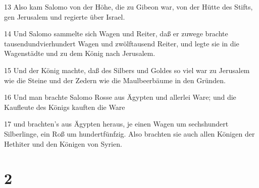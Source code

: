\par 13 Also kam Salomo von der Höhe, die zu Gibeon war, von der Hütte des Stifts, gen Jerusalem und regierte über Israel.
\par 14 Und Salomo sammelte sich Wagen und Reiter, daß er zuwege brachte tausendundvierhundert Wagen und zwölftausend Reiter, und legte sie in die Wagenstädte und zu dem König nach Jerusalem.
\par 15 Und der König machte, daß des Silbers und Goldes so viel war zu Jerusalem wie die Steine und der Zedern wie die Maulbeerbäume in den Gründen.
\par 16 Und man brachte Salomo Rosse aus Ägypten und allerlei Ware; und die Kaufleute des Königs kauften die Ware
\par 17 und brachten's aus Ägypten heraus, je einen Wagen um sechshundert Silberlinge, ein Roß um hundertfünfzig. Also brachten sie auch allen Königen der Hethiter und den Königen von Syrien.

\chapter{2}

